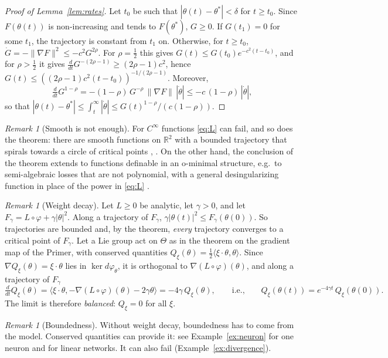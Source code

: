 \documentclass[11pt]{article}
\theoremstyle{definition}
\theoremstyle{remark}
\newtheorem{remark}[lemma]{Remark}
\newcommand{\R}{\mathbb{R}}
\newcommand{\ip}[2]{\langle #1,#2\rangle}
\begin{document}
\begin{proof}[Proof of Lemma~\ref{lem:rates}]
Let $t_0$ be such that $|\theta(t)-\theta^*|<\delta$ for $t\ge t_0$. Since $F(\theta(t))$ is non-increasing and tends to $F(\theta^*)$, $G\ge0$. If $G(t_1)=0$ for some $t_1$, the trajectory is constant from $t_1$ on. Otherwise, for $t\ge t_0$, $\dot G=-\|\nabla F\|^2\le-c^2G^{2\rho}$. For $\rho=\frac12$ this gives $G(t)\le G(t_0)e^{-c^2(t-t_0)}$, and for $\rho>\frac12$ it gives $\frac{d}{dt}G^{-(2\rho-1)}\ge(2\rho-1)c^2$, hence $G(t)\le((2\rho-1)c^2(t-t_0))^{-1/(2\rho-1)}$. Moreover,
\[
\tfrac{d}{dt}G^{1-\rho}=-(1-\rho)\,G^{-\rho}\,\|\nabla F\|\,|\dot\theta|\le-c\,(1-\rho)\,|\dot\theta| ,
\]
so that $|\theta(t)-\theta^*|\le\int_t^\infty|\dot\theta|\le G(t)^{1-\rho}/(c(1-\rho))$.
\end{proof}

\begin{remark}[Smooth is not enough]
For $C^\infty$ functions \eqref{eq:L} can fail, and so does the theorem: there are smooth functions on $\R^2$ with a bounded trajectory that spirals towards a circle of critical points \cite[p.~14]{PdM82}, \cite{AMA05}. On the other hand, the conclusion of the theorem extends to functions definable in an o-minimal structure, e.g.\ to semi-algebraic losses that are not polynomial, with a general desingularizing function in place of the power in \eqref{eq:L} \cite{Kur98}.
\end{remark}

\begin{remark}[Weight decay]\label{rem:decay}
Let $L\ge0$ be analytic, let $\gamma>0$, and let $F_\gamma=L\circ\varphi+\gamma|\theta|^2$. Along a trajectory of $F_\gamma$, $\gamma|\theta(t)|^2\le F_\gamma(\theta(0))$. So trajectories are bounded and, by the theorem, \emph{every} trajectory converges to a critical point of $F_\gamma$. Let a Lie group act on $\Theta$ as in the theorem on the gradient map of the Primer, with conserved quantities $Q_\xi(\theta)=\frac12\ip{\xi\cdot\theta}{\theta}$. Since $\nabla Q_\xi(\theta)=\xi\cdot\theta$ lies in $\ker d\varphi_\theta$, it is orthogonal to $\nabla(L\circ\varphi)(\theta)$, and along a trajectory of $F_\gamma$
\[
\tfrac{d}{dt}Q_\xi(\theta)=\ip{\xi\cdot\theta}{-\nabla(L\circ\varphi)(\theta)-2\gamma\theta}=-4\gamma\,Q_\xi(\theta),\qquad\text{i.e.,}\qquad Q_\xi(\theta(t))=e^{-4\gamma t}\,Q_\xi(\theta(0)).
\]
The limit is therefore \emph{balanced}: $Q_\xi=0$ for all $\xi$.
\end{remark}

\begin{remark}[Boundedness]\label{rem:bounded}
Without weight decay, boundedness has to come from the model. Conserved quantities can provide it: see Example~\ref{ex:neuron} for one neuron and \cite{BRTW22} for linear networks. It can also fail (Example~\ref{ex:divergence}).
\end{remark}
\end{document}
